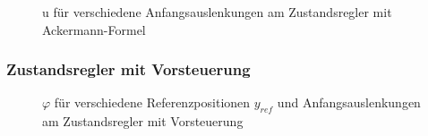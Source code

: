 \documentclass[
	pagesize,
	fontsize=12pt,
	paper=a4,
	oneside,
   reqno
]{scrartcl}
\begin{document}
\begin{figure}[H]
    \centering
    \caption[u für Regler mit Ackermann-Formel]{u für verschiedene Anfangsauslenkungen am Zustandsregler mit Ackermann-Formel}
    \label{fig:Bild14}
\end{figure}

\subsubsection{Zustandsregler mit Vorsteuerung}

\begin{figure}[H]
    \centering
    \caption[$\varphi$ für Regler mit Vorsteuerung]{$\varphi$ für verschiedene Referenzpositionen $y_{ref}$ und Anfangsauslenkungen am Zustandsregler mit Vorsteuerung}
    \label{fig:Bild15}
\end{figure}
\end{document}
